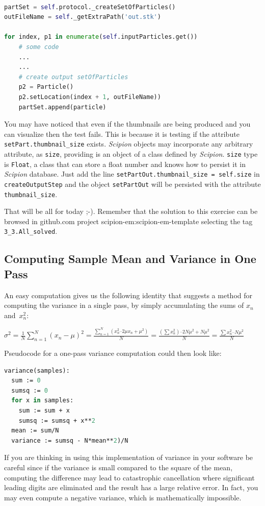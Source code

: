 \documentclass[12pt]{article} %
\def\scipion{\textit{Scipion}\xspace}
\newcommand{\ttt}[1]{\texttt{#1}}
\begin{document}
\begin{lstlisting}[language=Python,label={lst:setofParticles}, caption="Creating an output set of particles"]

partSet = self.protocol._createSetOfParticles()
outFileName = self._getExtraPath('out.stk')

for index, p1 in enumerate(self.inputParticles.get())
    # some code
    ...
    ...
    # create output setOfParticles  
    p2 = Particle()
    p2.setLocation(index + 1, outFileName))
    partSet.append(particle)
\end{lstlisting}

You may have noticed that even if the thumbnails are being produced and you can visualize then the test fails. This is because it is testing if the attribute 
\ttt{setPart.thumbnail\_size} exists. \scipion objects may incorporate any arbitrary attribute, as \ttt{size}, providing is an object of a class defined by \scipion. \ttt{size} type is \ttt{Float}, a class that can store a float number and knows how to persist it in \scipion database. Just add the line \ttt{setPartOut.thumbnail\_size = self.size} in \ttt{createOutputStep}
and the object \ttt{setPartOut} will be persisted with the attribute \ttt{thumbnail\_size}.

That will be all for today ;-). Remember  that the solution to this exercise can be browsed in github.com project scipion-em:scipion-em-template selecting the tag \ttt{3\_3.All\_solved}.

%
%


\begin{appendices}
\section{Computing Sample Mean and Variance in One Pass}
\label{app:variance}

An easy computation gives us the following identity that suggests a method for computing the variance in a single pass, by simply accumulating the sums of $x_n$ and~$x^2_n$:

$\sigma^2 
={ {{\frac {1}{N}}\sum _{n=1}^{N}\left(x_n-{\mu}\right)^{2}}} =
\frac{\sum_{n=1}^N (x_n^2 – 2\mu x_n + \mu^2)}{N} = \frac{(\sum x_n^2) – 2 N \mu^2 + N \mu^2}{N} = \frac{\sum x_n^2 – N \mu^2}{N}$

Pseudocode for a one-pass variance computation could then look like:


\begin{lstlisting}[language=Pascal]
variance(samples):
  sum := 0
  sumsq := 0
  for x in samples:
    sum := sum + x
    sumsq := sumsq + x**2
  mean := sum/N 
  variance := sumsq - N*mean**2)/N
\end{lstlisting}

If you are thinking in using this implementation of variance in your software be careful since if the variance is small compared to the square of the mean, computing the difference may lead to catastrophic cancellation where significant leading digits are eliminated and the result has a large relative error. In fact, you may even compute a negative variance, which is mathematically impossible.

\end{appendices}
\end{document}
